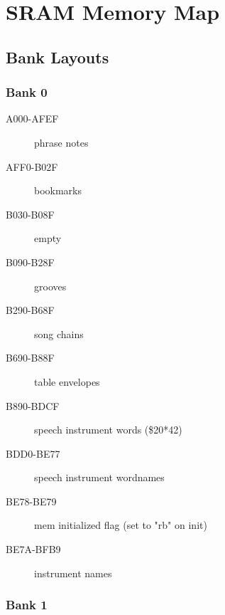 \chapter{SRAM Memory Map}

\section{Bank Layouts}

\subsection{Bank 0}

\begin{description}
    \item[A000-AFEF] phrase notes
    \item[AFF0-B02F] bookmarks
    \item[B030-B08F] empty
    \item[B090-B28F] grooves
    \item[B290-B68F] song chains
    \item[B690-B88F] table envelopes
    \item[B890-BDCF] speech instrument words (\$20*42)
    \item[BDD0-BE77] speech instrument wordnames
    \item[BE78-BE79] mem initialized flag (set to "rb" on init)
    \item[BE7A-BFB9] instrument names
\end{description}

\subsection{Bank 1}

